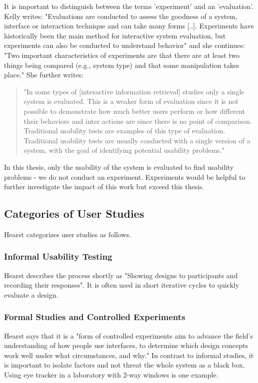 \documentclass[11pt]{report}
\begin{document}
It is important to distinguish between the terms 'experiment' and an 'evaluation'. Kelly \cite{Kelly2007} writes: "Evaluations are conducted to assess the goodness of a system, interface or interaction technique and can take many forms [..]. Experiments have historically been the main method for interactive system evaluation, but experiments can also be conducted to understand behavior" and she continues: "Two important characteristics of experiments are that there are at least two things being compared (e.g., system type) and that some manipulation takes place." She further writes:
\begin{quote}
"In some types of [interactive information retrieval] studies only a single system is evaluated. This is a weaker form of evaluation since it is not possible to demonstrate how much better users perform or how different their behaviors and inter actions are since there is no point of comparison. Traditional usability tests are examples of this type of evaluation. Traditional usability tests are usually conducted with a single version of a system, with the goal of identifying potential usability problems."	
\end{quote}

In this thesis, only the usability of the system is evaluated to find usability problems - we do not conduct an experiment. Experiments would be helpful to further investigate the impact of this work but exceed this thesis.

\subsection{Categories of User Studies}
Hearst \cite{Hearst2009} categorizes user studies as follows.

\subsubsection{Informal Usability Testing}
Hearst \cite{Hearst2009} describes the process shortly as "Showing designs to participants and recording their responses". It is often used in short iterative cycles to quickly evaluate a design.

\subsubsection{Formal Studies and Controlled Experiments}
Hearst \cite{Hearst2009} says that it is a "form of controlled experiments aim to advance the field's understanding of how people use interfaces, to determine which design concepts work well under what circumstances, and why."  In contrast to informal studies, it is important to isolate factors and not threat the whole system as a black box. Using eye tracker in a laboratory with 2-way windows is one example.
	
\end{document}
